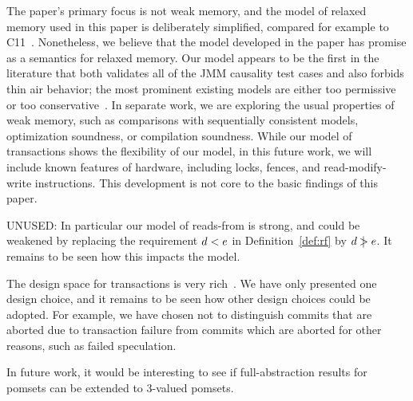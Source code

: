 \documentclass[conference]{IEEEtran}
\theoremstyle{plain}
\theoremstyle{definition}
\begin{document}
The paper's primary focus is not weak memory, and the model of relaxed
memory used in this paper is deliberately simplified, compared for
example to
C11~\cite{Boehm:2008:FCC:1375581.1375591,Batty:2011:MCC:1926385.1926394}. Nonetheless,
we believe that the model developed in the paper has promise as a
semantics for relaxed memory. Our model appears to be the first in the
literature that both validates all of the JMM causality test cases and
also forbids thin air behavior; the most prominent existing models are
either too permissive~\cite{Manson:2005:JMM:1047659.1040336,
  Jagadeesan:2010:GOS:2175486.2175503,Kang-promising-2017} or
too conservative~\cite{DBLP:conf/lics/JeffreyR16}.  In separate work,
we are exploring the usual properties of weak memory, such as
comparisons with sequentially consistent models,
optimization soundness, or compilation soundness.  While our model of
transactions shows the flexibility of our model, in this future work,
we will include known features of hardware, including locks, fences,
and read-modify-write instructions.  This development is not core to
the basic findings of this paper.



UNUSED: In particular our model of reads-from is strong, and could be weakened
by replacing the requirement $d<e$ in Definition~\ref{def:rf} by $d\mathrel{\,\mid\!\!\!>}e$. It remains to be seen how this impacts the model.

The design space for transactions is very rich~\cite{DBLP:journals/pacmpl/DongolJR18}.
We have only presented one design choice, and it remains to be seen how other
design choices could be adopted. For example, we have chosen not to distinguish
commits that are aborted due to transaction failure from commits which are aborted
for other reasons, such as failed speculation.

In future work, it would be interesting to see if full-abstraction
results for pomsets \cite{Plotkin:1997:TSP:266557.266600} can be extended to
3-valued pomsets.
\end{document}
